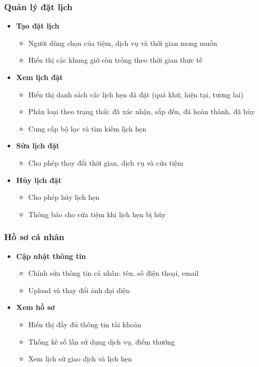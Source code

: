 \subsubsection{Quản lý đặt lịch}
\begin{itemize}
    \item \textbf{Tạo đặt lịch}
    \begin{itemize}
        \item Người dùng chọn của tiệm, dịch vụ và thời gian mong muốn
        \item Hiển thị các khung giờ còn trống theo thời gian thực tế
    \end{itemize}
    
    \item \textbf{Xem lịch đặt}
    \begin{itemize}
        \item Hiển thị danh sách các lịch hẹn đã đặt (quá khứ, hiện tại, tương lai)
        \item Phân loại theo trạng thái: đã xác nhận, sắp đến, đã hoàn thành, đã hủy
        \item Cung cấp bộ lọc và tìm kiếm lịch hẹn
    \end{itemize}
    
    \item \textbf{Sửa lịch đặt}
    \begin{itemize}
        \item Cho phép thay đổi thời gian, dịch vụ và cửa tiệm
    \end{itemize}
    
    \item \textbf{Hủy lịch đặt}
    \begin{itemize}
        \item Cho phép hủy lịch hẹn 
        \item Thông báo cho cửa tiệm khi lịch hẹn bị hủy
    \end{itemize}
\end{itemize}

\subsubsection{Hồ sơ cá nhân}
\begin{itemize}
    \item \textbf{Cập nhật thông tin}
    \begin{itemize}
        \item Chỉnh sửa thông tin cá nhân: tên, số điện thoại, email
        \item Upload và thay đổi ảnh đại diện
    \end{itemize}
    
    \item \textbf{Xem hồ sơ}
    \begin{itemize}
        \item Hiển thị đầy đủ thông tin tài khoản
        \item Thống kê số lần sử dụng dịch vụ, điểm thưởng
        \item Xem lịch sử giao dịch và lịch hẹn
    \end{itemize}
\end{itemize}

